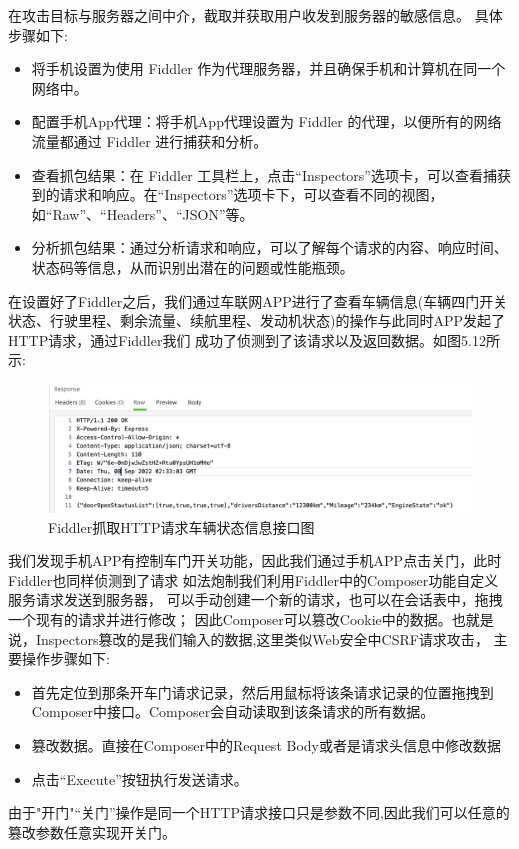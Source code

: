 在攻击目标与服务器之间中介，截取并获取用户收发到服务器的敏感信息。
具体步骤如下:
\begin{itemize}
    \item 将手机设置为使用 Fiddler 作为代理服务器，并且确保手机和计算机在同一个网络中。
    \item 配置手机App代理：将手机App代理设置为 Fiddler 的代理，以便所有的网络流量都通过 Fiddler 进行捕获和分析。
    \item 查看抓包结果：在 Fiddler 工具栏上，点击“Inspectors”选项卡，可以查看捕获到的请求和响应。在“Inspectors”选项卡下，可以查看不同的视图，如“Raw”、“Headers”、“JSON”等。
    \item 分析抓包结果：通过分析请求和响应，可以了解每个请求的内容、响应时间、状态码等信息，从而识别出潜在的问题或性能瓶颈。
\end{itemize}

在设置好了Fiddler之后，我们通过车联网APP进行了查看车辆信息(车辆四门开关状态、行驶里程、剩余流量、续航里程、发动机状态)的操作与此同时APP发起了HTTP请求，通过Fiddler我们
成功了侦测到了该请求以及返回数据。如图5.12所示:
\begin{figure}
  \centering
  \includegraphics[scale=0.5]{resources/img/i26.png}
  \caption{Fiddler抓取HTTP请求车辆状态信息接口图}
\end{figure}
我们发现手机APP有控制车门开关功能，因此我们通过手机APP点击关门，此时Fiddler也同样侦测到了请求
如法炮制我们利用Fiddler中的Composer功能自定义服务请求发送到服务器，
可以手动创建一个新的请求，也可以在会话表中，拖拽一个现有的请求并进行修改；
因此Composer可以篡改Cookie中的数据。也就是说，Inspectors篡改的是我们输入的数据,这里类似Web安全中CSRF请求攻击\cite{blatz2007csrf}，
主要操作步骤如下:
\begin{itemize}
  \item 首先定位到那条开车门请求记录，然后用鼠标将该条请求记录的位置拖拽到Composer中接口。Composer会自动读取到该条请求的所有数据。
  \item 篡改数据。直接在Composer中的Request Body或者是请求头信息中修改数据
  \item 点击“Execute”按钮执行发送请求。
\end{itemize}
由于"开门"“关门”操作是同一个HTTP请求接口只是参数不同,因此我们可以任意的篡改参数任意实现开关门。
